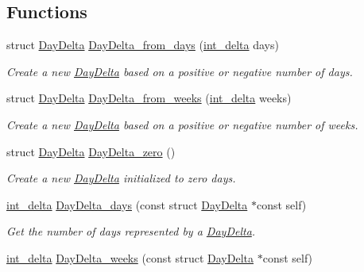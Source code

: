 \subsection*{\-Functions}
\begin{DoxyCompactItemize}
\item 
struct \hyperlink{structDayDelta}{\-Day\-Delta} \hyperlink{day-delta_8h_a50a5b111e380372e918e4d67f4b1814d}{\-Day\-Delta\-\_\-from\-\_\-days} (\hyperlink{types_8h_a8a67cf99971c5cfeeaa2380ba84a4c92}{int\-\_\-delta} days)
\begin{DoxyCompactList}\small\item\em \-Create a new \hyperlink{structDayDelta}{\-Day\-Delta} based on a positive or negative number of days. \end{DoxyCompactList}\item 
struct \hyperlink{structDayDelta}{\-Day\-Delta} \hyperlink{day-delta_8h_ac44c70541cf4f255f25384194341ff07}{\-Day\-Delta\-\_\-from\-\_\-weeks} (\hyperlink{types_8h_a8a67cf99971c5cfeeaa2380ba84a4c92}{int\-\_\-delta} weeks)
\begin{DoxyCompactList}\small\item\em \-Create a new \hyperlink{structDayDelta}{\-Day\-Delta} based on a positive or negative number of weeks. \end{DoxyCompactList}\item 
struct \hyperlink{structDayDelta}{\-Day\-Delta} \hyperlink{day-delta_8h_ab87d828518fe1bdc7e7662be3e5e6289}{\-Day\-Delta\-\_\-zero} ()
\begin{DoxyCompactList}\small\item\em \-Create a new \hyperlink{structDayDelta}{\-Day\-Delta} initialized to zero days. \end{DoxyCompactList}\item 
\hyperlink{types_8h_a8a67cf99971c5cfeeaa2380ba84a4c92}{int\-\_\-delta} \hyperlink{day-delta_8h_aa57ce59c7908dcad9d8dcc18c84909a6}{\-Day\-Delta\-\_\-days} (const struct \hyperlink{structDayDelta}{\-Day\-Delta} $\ast$const self)
\begin{DoxyCompactList}\small\item\em \-Get the number of days represented by a \hyperlink{structDayDelta}{\-Day\-Delta}. \end{DoxyCompactList}\item 
\hyperlink{types_8h_a8a67cf99971c5cfeeaa2380ba84a4c92}{int\-\_\-delta} \hyperlink{day-delta_8h_ae0cf870931630123311dc3f532916813}{\-Day\-Delta\-\_\-weeks} (const struct \hyperlink{structDayDelta}{\-Day\-Delta} $\ast$const self)

\end{DoxyCompactItemize}

